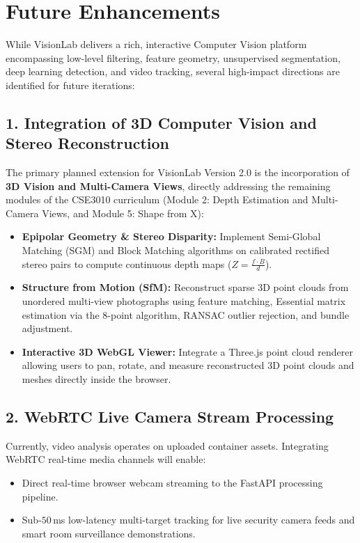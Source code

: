 \section{Future Enhancements}

While VisionLab delivers a rich, interactive Computer Vision platform encompassing low-level filtering, feature geometry, unsupervised segmentation, deep learning detection, and video tracking, several high-impact directions are identified for future iterations:

\subsection{1. Integration of 3D Computer Vision and Stereo Reconstruction}
The primary planned extension for VisionLab Version 2.0 is the incorporation of \textbf{3D Vision and Multi-Camera Views}, directly addressing the remaining modules of the CSE3010 curriculum (Module 2: Depth Estimation and Multi-Camera Views, and Module 5: Shape from X):
\begin{itemize}
    \item \textbf{Epipolar Geometry \& Stereo Disparity:} Implement Semi-Global Matching (SGM) and Block Matching algorithms on calibrated rectified stereo pairs to compute continuous depth maps ($Z = \frac{f \cdot B}{d}$).
    \item \textbf{Structure from Motion (SfM):} Reconstruct sparse 3D point clouds from unordered multi-view photographs using feature matching, Essential matrix estimation via the 8-point algorithm, RANSAC outlier rejection, and bundle adjustment.
    \item \textbf{Interactive 3D WebGL Viewer:} Integrate a Three.js point cloud renderer allowing users to pan, rotate, and measure reconstructed 3D point clouds and meshes directly inside the browser.
\end{itemize}

\subsection{2. WebRTC Live Camera Stream Processing}
Currently, video analysis operates on uploaded container assets. Integrating WebRTC real-time media channels will enable:
\begin{itemize}
    \item Direct real-time browser webcam streaming to the FastAPI processing pipeline.
    \item Sub-$50$\,ms low-latency multi-target tracking for live security camera feeds and smart room surveillance demonstrations.
\end{itemize}

